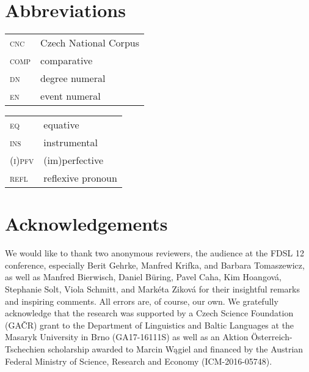 \documentclass[output=paper,
modfonts,
hidelinks,
newtxmath
]{langscibook}
\begin{document}
\section*{Abbreviations}

\begin{tabularx}{.5\textwidth}{@{}lQ@{}}
\textsc{cnc}&Czech National Corpus\\
\textsc{comp}&comparative\\
\textsc{dn}&degree numeral\\
\textsc{en}&event numeral\\
\end{tabularx}%
\begin{tabularx}{.5\textwidth}{@{}lQ@{}}
\textsc{eq}&equative\\
\textsc{ins}&instrumental\\
\textsc{(i)pfv}&(im)perfective\\
\textsc{refl}&reflexive pronoun\\
\end{tabularx}

\section*{Acknowledgements}
We would like to thank two anonymous reviewers, the audience at the FDSL 12 conference, especially Berit Gehrke, Manfred Krifka, and Barbara Tomaszewicz, as well as Manfred Bierwisch, Daniel Büring, Pavel Caha, Kim Hoangová, Stepha\-nie Solt, Viola Schmitt, and Markéta Ziková for their insightful remarks and inspiring comments. All errors are, of course, our own. We gratefully acknowledge that the research was supported by a Czech Science Foundation (GAČR) grant to the Department of Linguistics and Baltic Languages at the Masaryk University in Brno (GA17-16111S) as well as an Aktion Österreich-Tschechien scholarship awarded to Marcin Wągiel and financed by the Austrian Federal Ministry of Science, Research and Economy (ICM-2016-05748).

\sloppy
\printbibliography[heading=subbibliography,notkeyword=this]
\end{document}
